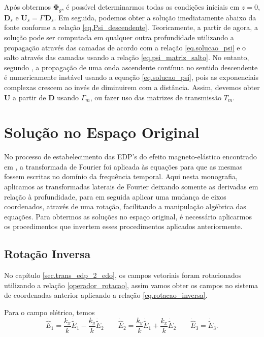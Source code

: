 Ap\'os obtermos $\mathbf{\Phi}_g$, \'e poss\'ivel determinarmos todas as condi\c{c}\~oes iniciais em $z=0$, $\mathbf{D}_s$ e $\mathbf{U}_s=\Gamma\,\mathbf{D}_s$. Em seguida, podemos obter a solu\c{c}\~ao imediatamente abaixo da fonte conforme a rela\c{c}\~ao \ref{eq.Psi_descendente}. Teoricamente, a partir de agora, a solu\c{c}\~ao pode ser computada em qualquer outra profundidade utilizando a propaga\c{c}\~ao atrav\'es das camadas de acordo com a rela\c{c}\~ao \ref{eq.solucao_psi} e o salto atrav\'es das camadas usando a rela\c{c}\~ao \ref{eq.psi_matriz_salto}. No entanto, segundo \cite{White_Zhou_2006}, a propaga\c{c}\~ao de uma onda ascendente cont\'inua no sentido descendente \'e numericamente inst\'avel usando a equa\c{c}\~ao \ref{eq.solucao_psi}, pois as exponenciais complexas crescem ao inv\'es de diminuirem com a dist\^ancia. Assim, devemos obter $\mathbf{U}$ a partir de $\mathbf{D}$ usando $\Gamma_m$, ou fazer uso das matrizes de transmiss\~ao $T_m$.

\section{Solu\c{c}\~ao no Espa\c{c}o Original}

No processo de estabelecimento das EDP's do efeito magneto-el\'astico encontrado em \cite{pinho_2018}, a transformada de Fourier foi aplicada \`as equa\c{c}\~oes para que as mesmas fossem escritas no dom\'inio da frequ\^encia temporal. Aqui nesta monografia, aplicamos as transformadas laterais de Fourier deixando somente as derivadas em rela\c{c}\~ao \`a profundidade, para em seguida aplicar uma mudan\c{c}a de eixos coordenados, atrav\'es de uma rota\c{c}\~ao, facilitando a manipula\c{c}\~ao alg\'ebrica das equa\c{c}\~oes. Para obtermos as solu\c{c}\~oes no espa\c{c}o original, \'e necess\'ario aplicarmos os procedimentos que invertem esses procedimentos aplicados anteriormente.

\subsection{Rota\c{c}\~ao Inversa}
No cap\'itulo \ref{sec.trans_edp_2_edo}, os campos vetoriais foram rotacionados utilizando a rela\c{c}\~ao \ref{operador_rotacao}, assim vamos obter os campos no sistema de coordenadas anterior aplicando a rela\c{c}\~ao \ref{eq.rotacao_inversa}. 


Para o campo el\'etrico, temos
\begin{equation*}
\dot{\hat{E}}_1=\frac{k_x}{k}\dot{\tilde{E}}_1-\frac{k_y}{k}\dot{\tilde{E}}_2\qquad
\dot{\hat{E}}_2=\frac{k_y}{k}\dot{\tilde{E}}_1+\frac{k_x}{k}\dot{\tilde{E}}_2\qquad
\dot{\hat{E}}_3=\dot{\tilde{E}}_3.
\end{equation*}


